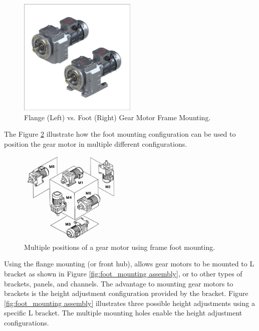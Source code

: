 \begin{figure}[H]
    \centering
    \includegraphics[width=0.5\textwidth]{Sections/LiteratureReview/img/LegAssembly/flange_foot_mounted_gearMotor.jpg}
    \caption{Flange (Left) vs. Foot (Right) Gear Motor Frame Mounting. \cite{dinamik_motor_foot-flange_nodate}}
    \label{fig:foot_mounting _frame}
\end{figure}

The Figure \ref{fig:form_mounting} illustrate how the foot mounting configuration can be used to position the gear motor in multiple different configurations. 

\begin{figure}[H]
    \centering
    \includegraphics[width=0.5\textwidth]{Sections/LiteratureReview/img/LegAssembly/mounting_forms.jpg}
    \caption{Multiple positions of a gear motor using frame foot mounting.  \cite{taiqi_seiko_inline_nodate}}
    \label{fig:form_mounting}
\end{figure}

Using the flange mounting (or front hub), allows gear motors to be mounted to L bracket as shown in Figure \ref{fig:foot_mounting assembly}, or to other types of brackets, panels, and channels. The advantage to mounting gear motors to brackets is the height adjustment configuration provided by the bracket. Figure \ref{fig:foot_mounting assembly} illustrates three possible height adjustments using a specific L bracket. The multiple mounting holes enable the height adjustment configurations. 

